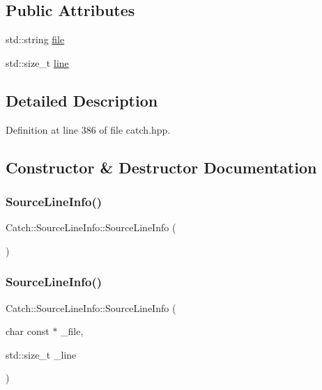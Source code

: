 \subsection*{Public Attributes}
\begin{DoxyCompactItemize}
\item 
std\+::string \hyperlink{struct_catch_1_1_source_line_info_adf3ccf0c2bd326eb3466318af82a94dd}{file}
\item 
std\+::size\+\_\+t \hyperlink{struct_catch_1_1_source_line_info_a841e5d696c7b9cde24e45e61dd979c77}{line}
\end{DoxyCompactItemize}


\subsection{Detailed Description}


Definition at line 386 of file catch.\+hpp.



\subsection{Constructor \& Destructor Documentation}
\hypertarget{struct_catch_1_1_source_line_info_a9d44b2e1133794eee0bd5716424c83d6}{}\label{struct_catch_1_1_source_line_info_a9d44b2e1133794eee0bd5716424c83d6} 
\subsubsection{\texorpdfstring{Source\+Line\+Info()}{SourceLineInfo()}\hspace{0.1cm}{\footnotesize\ttfamily [1/3]}}
{\footnotesize\ttfamily Catch\+::\+Source\+Line\+Info\+::\+Source\+Line\+Info (\begin{DoxyParamCaption}{ }\end{DoxyParamCaption})}

\hypertarget{struct_catch_1_1_source_line_info_a6218cb890337d37f708ea94063958940}{}\label{struct_catch_1_1_source_line_info_a6218cb890337d37f708ea94063958940} 
\subsubsection{\texorpdfstring{Source\+Line\+Info()}{SourceLineInfo()}\hspace{0.1cm}{\footnotesize\ttfamily [2/3]}}
{\footnotesize\ttfamily Catch\+::\+Source\+Line\+Info\+::\+Source\+Line\+Info (\begin{DoxyParamCaption}\item[{char const $\ast$}]{\+\_\+file,  }\item[{std\+::size\+\_\+t}]{\+\_\+line }\end{DoxyParamCaption})}


